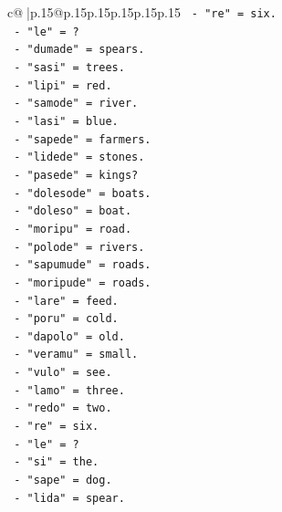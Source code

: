 \documentclass{article}
\begin{document}
{\begin{supertabular}{c@{$\;$}|p{.15\linewidth}@{}p{.15\linewidth}p{.15\linewidth}p{.15\linewidth}p{.15\linewidth}p{.15\linewidth}}
{{{\texttt{                        {-} "re" = six.} \\
\texttt{                        {-} "le" = ?} \\
\texttt{                        {-} "dumade" = spears.} \\
\texttt{                        {-} "sasi" = trees.} \\
\texttt{                        {-} "lipi" = red.} \\
\texttt{                        {-} "samode" = river.} \\
\texttt{                        {-} "lasi" = blue.} \\
\texttt{                        {-} "sapede" = farmers.} \\
\texttt{                        {-} "lidede" = stones.} \\
\texttt{                        {-} "pasede" = kings?} \\
\texttt{                        {-} "dolesode" = boats.} \\
\texttt{                        {-} "doleso" = boat.} \\
\texttt{                        {-} "moripu" = road.} \\
\texttt{                        {-} "polode" = rivers.} \\
\texttt{                        {-} "sapumude" = roads.} \\
\texttt{                        {-} "moripude" = roads.} \\
\texttt{                        {-} "lare" = feed.} \\
\texttt{                        {-} "poru" = cold.} \\
\texttt{                        {-} "dapolo" = old.} \\
\texttt{                        {-} "veramu" = small.} \\
\texttt{                        {-} "vulo" = see.} \\
\texttt{                        {-} "lamo" = three.} \\
\texttt{                        {-} "redo" = two.} \\
\texttt{                        {-} "re" = six.} \\
\texttt{                        {-} "le" = ?} \\
\texttt{                        {-} "si" = the.} \\
\texttt{                        {-} "sape" = dog.} \\
\texttt{                        {-} "lida" = spear.} \\
}}}
\end{supertabular}}
\end{document}
